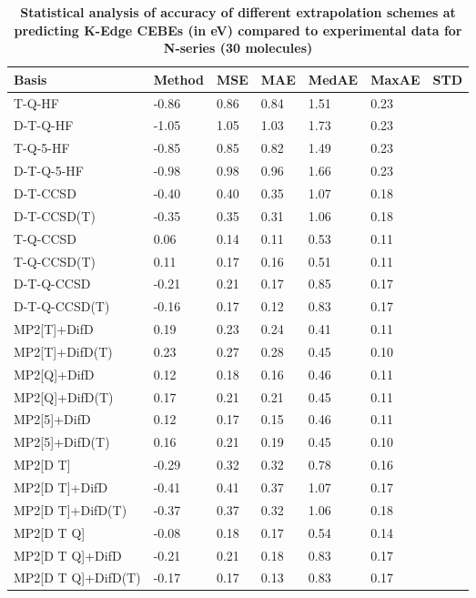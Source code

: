 \begin{table}
  \caption{\textbf{Statistical analysis of accuracy of different extrapolation schemes at predicting K-Edge CEBEs (in eV) compared to experimental data for N-series (30 molecules)}}
  \label{tbl:extrap-scheme-summary-n}
  \begin{tabular}{l l l l l l l }
    \toprule
    \textbf{Basis} & \textbf{Method} & \textbf{MSE} & \textbf{MAE} & \textbf{MedAE} & \textbf{MaxAE} & \textbf{STD} \\ 
    \midrule
    T-Q-HF & -0.86 & 0.86 & 0.84 & 1.51 & 0.23 \\ 
    D-T-Q-HF & -1.05 & 1.05 & 1.03 & 1.73 & 0.23 \\ 
    T-Q-5-HF & -0.85 & 0.85 & 0.82 & 1.49 & 0.23 \\ 
    D-T-Q-5-HF & -0.98 & 0.98 & 0.96 & 1.66 & 0.23 \\ 
    D-T-CCSD & -0.40 & 0.40 & 0.35 & 1.07 & 0.18 \\ 
    D-T-CCSD(T) & -0.35 & 0.35 & 0.31 & 1.06 & 0.18 \\ 
    T-Q-CCSD & 0.06 & 0.14 & 0.11 & 0.53 & 0.11 \\ 
    T-Q-CCSD(T) & 0.11 & 0.17 & 0.16 & 0.51 & 0.11 \\ 
    D-T-Q-CCSD & -0.21 & 0.21 & 0.17 & 0.85 & 0.17 \\ 
    D-T-Q-CCSD(T) & -0.16 & 0.17 & 0.12 & 0.83 & 0.17 \\ 
    MP2[T]+DifD & 0.19 & 0.23 & 0.24 & 0.41 & 0.11 \\ 
    MP2[T]+DifD(T) & 0.23 & 0.27 & 0.28 & 0.45 & 0.10 \\ 
    MP2[Q]+DifD & 0.12 & 0.18 & 0.16 & 0.46 & 0.11 \\ 
    MP2[Q]+DifD(T) & 0.17 & 0.21 & 0.21 & 0.45 & 0.11 \\ 
    MP2[5]+DifD & 0.12 & 0.17 & 0.15 & 0.46 & 0.11 \\ 
    MP2[5]+DifD(T) & 0.16 & 0.21 & 0.19 & 0.45 & 0.10 \\ 
    MP2[D T] & -0.29 & 0.32 & 0.32 & 0.78 & 0.16 \\ 
    MP2[D T]+DifD & -0.41 & 0.41 & 0.37 & 1.07 & 0.17 \\ 
    MP2[D T]+DifD(T) & -0.37 & 0.37 & 0.32 & 1.06 & 0.18 \\ 
    MP2[D T Q] & -0.08 & 0.18 & 0.17 & 0.54 & 0.14 \\ 
    MP2[D T Q]+DifD & -0.21 & 0.21 & 0.18 & 0.83 & 0.17 \\ 
    MP2[D T Q]+DifD(T) & -0.17 & 0.17 & 0.13 & 0.83 & 0.17 \\ 

\end{tabular}
\end{table}
